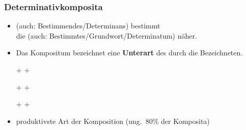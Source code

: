 
\begin{frame}
\frametitle{Determinativkomposita}

\begin{itemize}
	\item {} (auch: Bestimmendes/Determinans) bestimmt\\
	die  (auch: Bestimmtes/Grundwort/Determinatum) näher.

	\item Das Kompositum bezeichnet eine \textbf{Unterart} des durch die  Bezeichneten.

	\settowidth{}
	\ea 
		\ea {}$+$ 
		\ex {}$+$ 
		\z
	
	\ex 
		\ea {}$+$ 
		\ex {}$+$ 
		\z
	
	\ex 	
		\ea {}$+$ 
		\ex {}$+$ 
		\z 
	\z
	
	\item produktivste Art der Komposition (ung.\ 80\% der Komposita)
\end{itemize}

\end{frame}


